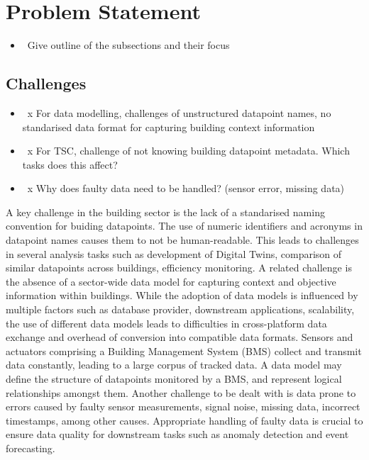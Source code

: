 
\chapter{Problem Statement}

\begin{itemize}[label={}]
	\color{red}
		\item \lbrack\  \rbrack	Give outline of the subsections and their focus
\end{itemize}

\section{Challenges}

\begin{itemize}[label={}]
\color{red}
    \item \lbrack\ x \rbrack	For data modelling, challenges of unstructured datapoint names, no standarised data format for capturing building context information
    \item \lbrack\ x \rbrack	For TSC, challenge of not knowing building datapoint metadata. Which tasks does this affect?
    \item \lbrack\ x \rbrack	Why does faulty data need to be handled? (sensor error, missing data)
\end{itemize}

A key challenge in the building sector is the lack of a standarised naming convention for buiding datapoints. The use of numeric identifiers and acronyms in datapoint names causes them to not be human-readable. This leads to challenges in several analysis tasks such as development of Digital Twins, comparison of similar datapoints across buildings, efficiency monitoring. A related challenge is the absence of a sector-wide data model for capturing context and objective information within buildings. While the adoption of data models is influenced by multiple factors such as database provider, downstream applications, scalability, the use of different data models leads to difficulties in cross-platform data exchange and overhead of conversion into compatible data formats. Sensors and actuators comprising a Building Management System (BMS) collect and transmit data constantly, leading to a large corpus of tracked data. A data model may define the structure of datapoints monitored by a BMS, and represent logical relationships amongst them.
Another challenge to be dealt with is data prone to errors caused by faulty sensor measurements, signal noise, missing data, incorrect timestamps, among other causes. Appropriate handling of faulty data is crucial to ensure data quality for downstream tasks such as anomaly detection and event forecasting.

